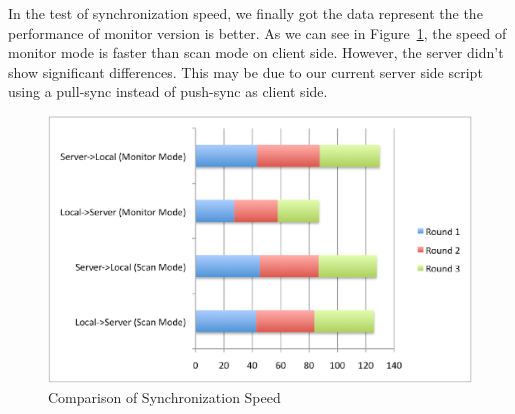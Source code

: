 In the test of synchronization speed, we finally got the data represent the the performance of monitor version is better. 
As we can see in Figure~\ref{fig:speed}, the speed of monitor mode is faster than scan mode on client side. However, the 
server didn't show significant differences. This may be due to our current server side script using a pull-sync instead of push-sync as client side. 
\begin{figure}[htp]
\centering
\includegraphics[scale=0.7]{speed}
\caption{Comparison of Synchronization Speed}\label{fig:speed}
\end{figure}
